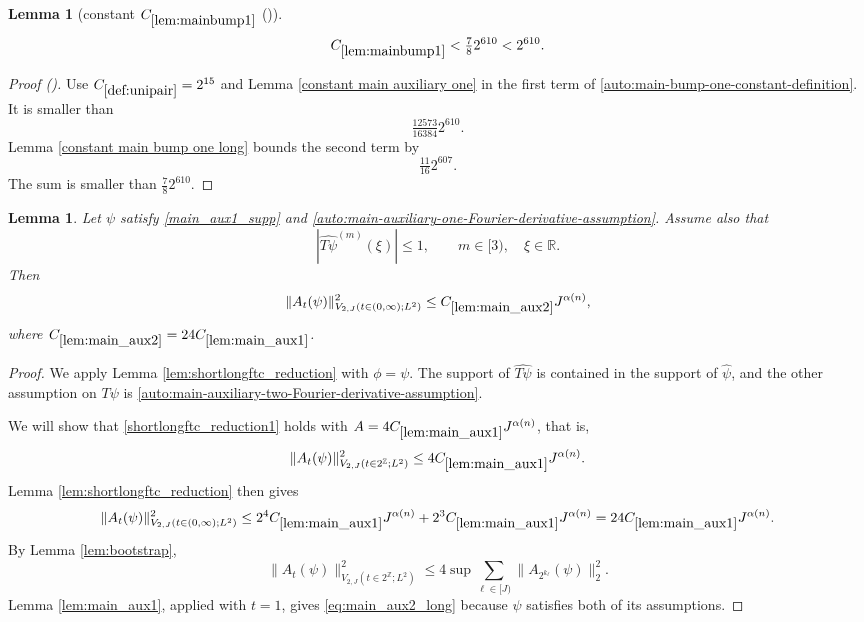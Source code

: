\documentclass[12pt,reqno]{amsart}
\newcommand{\auto}{{({\tiny\faCar})}}
\theoremstyle{plain}
\newtheorem{lemma}[theorem]{Lemma}
\numberwithin{equation}{section}
\theoremstyle{remark}
\newcommand{\uses}[1]{}
\newcommand{\usesdefs}[1]{}
\newcommand{\Z}{{\mathbb Z}}
\newcommand{\R}{{\mathbb R}}
\begin{document}
\begin{lemma}[constant $C_{\ref{lem:mainbump1}}$ \auto]\label{constant main bump one}\uses{constant main auxiliary one,lem:mainbump1,constant main bump one long}\usesdefs{def:unipair}
\begin{equation}\label{constant main bump one bound}
C_{\ref{lem:mainbump1}}<\tfrac78 2^{610}<2^{610}.
\end{equation}
\end{lemma}
\begin{proof}[Proof \auto]
Use $C_{\ref{def:unipair}}=2^{15}$ and Lemma \ref{constant main auxiliary one} in the first term of \eqref{auto:main-bump-one-constant-definition}. It is smaller than
\[
\tfrac{12573}{16384}2^{610}.
\]
Lemma \ref{constant main bump one long} bounds the second term by
\[
\tfrac{11}{16}2^{607}.
\]
The sum is smaller than $\frac78 2^{610}$.
\end{proof}

\begin{lemma}\label{lem:main_aux2}\uses{lem:shortlongftc_reduction,lem:main_aux1,lem:bootstrap}\usesdefs{A_def}
Let $\psi$ satisfy \eqref{main_aux1_supp} and \eqref{auto:main-auxiliary-one-Fourier-derivative-assumption}. Assume also that
\begin{equation}\label{auto:main-auxiliary-two-Fourier-derivative-assumption}
|\widehat{T\psi}^{(m)}(\xi)|\le1,
\qquad
m\in[3),
\quad
\xi\in\R.
\end{equation}
Then
\begin{equation}\label{main_aux2}
\|A_t(\psi)\|_{V_{2,J}(t\in(0,\infty);L^2)}^2
\le C_{\ref{lem:main_aux2}}J^{\alpha(n)},
\end{equation}
where $C_{\ref{lem:main_aux2}}=24C_{\ref{lem:main_aux1}}$.
\end{lemma}

\begin{proof}
We apply Lemma \ref{lem:shortlongftc_reduction} with $\phi=\psi$. The support of $\widehat{T\psi}$ is contained in the support of $\widehat\psi$, and the other assumption on $T\psi$ is \eqref{auto:main-auxiliary-two-Fourier-derivative-assumption}.

We will show that \eqref{shortlongftc_reduction1} holds with $A=4C_{\ref{lem:main_aux1}}J^{\alpha(n)}$, that is,
\begin{equation}\label{eq:main_aux2_long}
\|A_t(\psi)\|^2_{V_{2,J}(t\in2^\Z;L^2)}
\le4C_{\ref{lem:main_aux1}}J^{\alpha(n)}.
\end{equation}
Lemma \ref{lem:shortlongftc_reduction} then gives
\[
\|A_t(\psi)\|_{V_{2,J}(t\in(0,\infty);L^2)}^2
\le2^4C_{\ref{lem:main_aux1}}J^{\alpha(n)}
+2^3C_{\ref{lem:main_aux1}}J^{\alpha(n)}
=24C_{\ref{lem:main_aux1}}J^{\alpha(n)}.
\]
By Lemma \ref{lem:bootstrap},
\[
\|A_t(\psi)\|^2_{V_{2,J}(t\in2^\Z;L^2)}
\le4\sup\sum_{\ell\in[J)}\|A_{2^{k_\ell}}(\psi)\|_2^2.
\]
Lemma \ref{lem:main_aux1}, applied with $t=1$, gives \eqref{eq:main_aux2_long} because $\psi$ satisfies both of its assumptions.
\end{proof}
\end{document}
